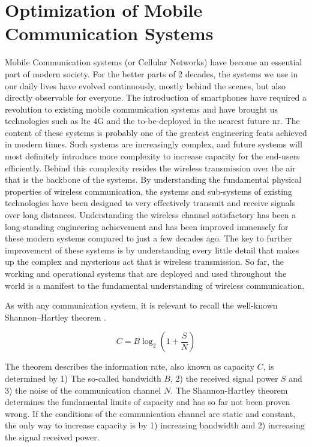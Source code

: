 \chapter{Optimization of Mobile Communication Systems}\label{ch:monster}

Mobile Communication systems (or Cellular Networks) have become an essential part of modern society. For the better parts of 2 decades, the systems we use in our daily lives have evolved continuously, mostly behind the scenes, but also directly observable for everyone. The introduction of smartphones have required a revolution to existing mobile communication systems and have brought us technologies such as \gls{lte} $4$G and the to-be-deployed in the nearest future \acrfull{nr}. The content of these systems is probably one of the greatest engineering feats achieved in modern times. Such systems are increasingly complex, and future systems will most definitely introduce more complexity to increase capacity for the end-users efficiently. Behind this complexity resides the wireless transmission over the air that is the backbone of the systems. By understanding the fundamental physical properties of wireless communication, the systems and sub-systems of existing technologies have been designed to very effectively transmit and receive signals over long distances. Understanding the wireless channel satisfactory has been a long-standing engineering achievement and has been improved immensely for these modern systems compared to just a few decades ago. The key to further improvement of these systems is by understanding every little detail that makes up the complex and mysterious act that is wireless transmission. So far, the working and operational systems that are deployed and used throughout the world is a manifest to the fundamental understanding of wireless communication. 

As with any communication system, it is relevant to recall the well-known Shannon–Hartley theorem \cite{Tse2005FundamentalsCommunication}.

\begin{equation}\label{eq:shannon}
    C = B \log_2 \left( 1 + \frac{S}{N} \right)
\end{equation}

The theorem describes the information rate, also known as capacity $C$, is determined by 1) The so-called bandwidth $B$, 2) the received signal power $S$ and 3) the noise of the communication channel $N$. The Shannon-Hartley theorem determines the fundamental limits of capacity and has so far not been proven wrong. If the conditions of the communication channel are static and constant, the only way to increase capacity is by 1) increasing bandwidth and 2) increasing the signal received power.

